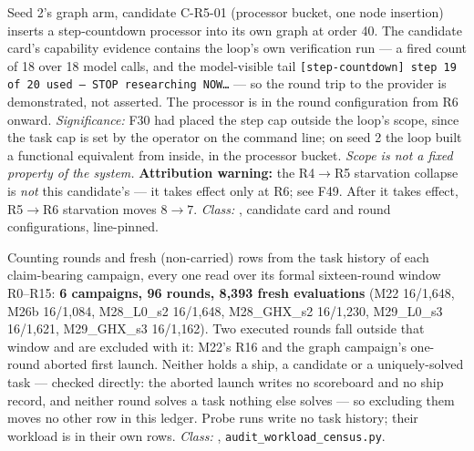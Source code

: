 \begin{description}[leftmargin=0pt,labelindent=0pt,labelsep=0pt,style=nextline,font=\normalfont,itemsep=6pt]
\item[\textbf{F50}\quad The loop builds its own step mechanism.]
Seed 2's graph arm, candidate C-R5-01 (processor bucket, one node
insertion) inserts a step-countdown processor into its own graph at order
40. The candidate card's capability evidence contains the loop's own
verification run --- a fired count of 18 over 18 model calls, and the
model-visible tail
\texttt{[step-countdown] step 19 of 20 used --- STOP researching NOW\ldots}
--- so the round trip to the provider is demonstrated, not asserted. The
processor is in the round configuration from R6 onward.
\emph{Significance:} F30 had placed the step cap outside the loop's scope,
since the task cap is set by the operator on the command line; on seed 2
the loop built a functional equivalent from inside, in the processor
bucket. \emph{Scope is not a fixed property of the system.}
\textbf{Attribution warning:} the R4$\to$R5 starvation collapse is
\emph{not} this candidate's --- it takes effect only at R6; see F49. After
it takes effect, R5$\to$R6 starvation moves $8 \to 7$.
\emph{Class:} , candidate card and round configurations, line-pinned.

\item[\textbf{F51}\quad The size of the evidence base.]
Counting rounds and fresh (non-carried) rows from the task history of each
claim-bearing campaign, every one read over its formal sixteen-round window
R0--R15: \textbf{6 campaigns, 96 rounds, 8{,}393 fresh evaluations}
(M22 16/1{,}648, M26b 16/1{,}084, M28\_L0\_s2 16/1{,}648,
M28\_GHX\_s2 16/1{,}230, M29\_L0\_s3 16/1{,}621, M29\_GHX\_s3 16/1{,}162).
Two executed rounds fall outside that window and are excluded with it:
M22's R16 and the graph campaign's one-round aborted first launch. Neither
holds a ship, a candidate or a uniquely-solved task --- checked directly:
the aborted launch writes no scoreboard and no ship record, and neither
round solves a task nothing else solves --- so excluding them moves no
other row in this ledger.
Probe runs write no task history; their workload is in their own rows.
\emph{Class:} , \texttt{audit\_workload\_census.py}.


\end{description}
